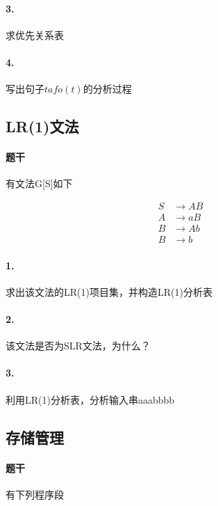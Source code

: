 \documentclass[UTF8]{ctexart} %
\begin{document}
\paragraph{3.} 求优先关系表

\paragraph{4.} 写出句子$tafo(t)$的分析过程

\subsection{LR(1)文法}

\paragraph{题干} 有文法G[S]如下

\begin{equation}
    \begin{aligned}
        S & \rightarrow AB \\
        A & \rightarrow aB \\
        B & \rightarrow Ab \\
        B & \rightarrow b
    \end{aligned}
\end{equation}

\paragraph{1.} 求出该文法的LR(1)项目集，并构造LR(1)分析表

\paragraph{2.} 该文法是否为SLR文法，为什么？

\paragraph{3.} 利用LR(1)分析表，分析输入串aaabbbb

\subsection{存储管理}

\paragraph{题干} 有下列程序段
\end{document}
